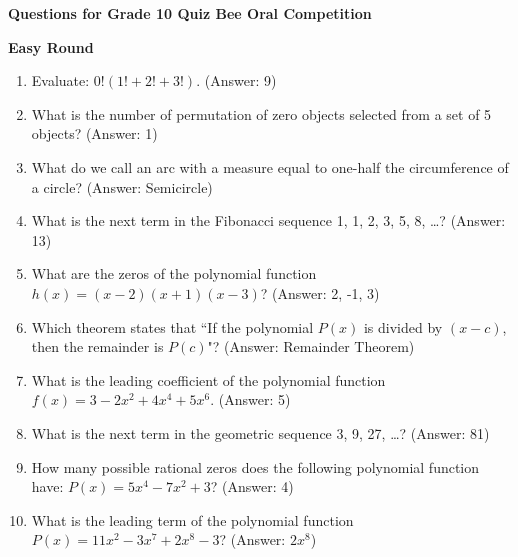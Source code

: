 
 

\linespread{1}

\newcommand{\ExamName}{Quiz Bee Oral Competition}



\begin{center}
\textbf{Questions for Grade 10 Quiz Bee Oral Competition}
\end{center} 

\textbf{Easy Round} 
%
{\begin{enumerate}[label = \arabic*. ]
\item Evaluate: $0!(1!+2!+3!)$. (Answer: 9)
\item What is the number of permutation of zero objects selected from a set of 5 objects? (Answer: 1)
\item What do we call an arc with a measure equal to one-half the circumference of a circle? (Answer: Semicircle)
\item What is the next term in the Fibonacci sequence 1, 1, 2, 3, 5, 8, \ldots?     (Answer: 13)
\item What are the zeros of the polynomial function $h(x) = (x-2) (x + 1) (x-3)$? (Answer: 2, -1, 3)
\item Which theorem states that ``If the polynomial $P(x)$ is divided by $(x-c)$, then the remainder is $P(c)$"?  (Answer: Remainder Theorem)
\item What is the leading coefficient of the polynomial function \mbox{$f(x) = 3-2x^2 + 4x^4 + 5x^6$}. (Answer: 5)
\item What is the next term in the geometric sequence  3, 9, 27, \ldots? (Answer: 81)
\item How many  possible rational zeros does the following polynomial  function have: $P(x) = 5x^4  - 7x^2 + 3$? (Answer: 4)
\item What is the leading term of the polynomial function $P(x) = 11x^2 - 3x^{7} + 2x^8 - 3$? (Answer: $2x^8$)
\end{enumerate}}

